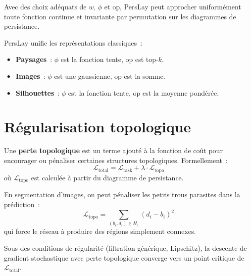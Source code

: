 \begin{proposition}
Avec des choix ad\'equats de $w$, $\phi$ et $\mathrm{op}$,
PersLay peut approcher uniform\'ement toute fonction continue
et invariante par permutation sur les diagrammes de persistance.
\end{proposition}

\begin{remarque}
PersLay unifie les repr\'esentations classiques~:
\begin{itemize}
  \item \textbf{Paysages}~: $\phi$ est la fonction tente,
        $\mathrm{op}$ est top-$k$.
  \item \textbf{Images}~: $\phi$ est une gaussienne,
        $\mathrm{op}$ est la somme.
  \item \textbf{Silhouettes}~: $\phi$ est la fonction tente,
        $\mathrm{op}$ est la moyenne pond\'er\'ee.
\end{itemize}
\end{remarque}

\section{R\'egularisation topologique}
\label{sec:regularisation}

\begin{definition}
Une \textbf{perte topologique} est un terme ajout\'e \`a la
fonction de co\^ut pour encourager ou p\'enaliser certaines
structures topologiques. Formellement~:
\[
  \mathcal{L}_{\mathrm{total}} = \mathcal{L}_{\mathrm{task}}
  + \lambda \cdot \mathcal{L}_{\mathrm{topo}}
\]
o\`u $\mathcal{L}_{\mathrm{topo}}$ est calcul\'ee \`a partir
du diagramme de persistance.
\end{definition}

\begin{exemple}
En segmentation d'images, on peut p\'enaliser les petits trous
parasites dans la pr\'ediction~:
\[
  \mathcal{L}_{\mathrm{topo}} = \sum_{(b_i, d_i) \in H_1}
  (d_i - b_i)^2
\]
qui force le r\'eseau \`a produire des r\'egions simplement connexes.
\end{exemple}

\begin{theoreme}
\label{thm:convergence_topo}
Sous des conditions de r\'egularit\'e (filtration g\'en\'erique,
Lipschitz), la descente de gradient stochastique avec perte
topologique converge vers un point critique de
$\mathcal{L}_{\mathrm{total}}$.
\end{theoreme}

